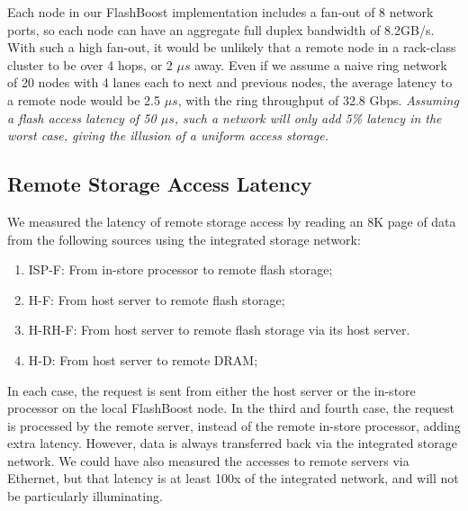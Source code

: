 Each node in our FlashBoost implementation includes a fan-out of 8 network
ports, so each node can have an aggregate full duplex bandwidth of 8.2GB/s. With
such a high fan-out, it would be unlikely that a remote node in a rack-class
cluster to be over 4 hops, or 2 $\mu s$ away. Even if we assume a naive ring
network of 20 nodes with 4 lanes each to next and previous nodes, the average
latency to a remote node would be 2.5 $\mu s$, with the ring throughput of 32.8
Gbps. \emph{Assuming a flash access latency of 50 $\mu s$, such a network will only add 5\% latency in the worst case, giving the illusion of a uniform access storage.}



\subsection{Remote Storage Access Latency}
\label{sec:latency}

We measured the latency of remote storage access by reading an 8K page of data from the following sources using the integrated storage network: 

\begin{enumerate}
\item ISP-F: From in-store processor to remote flash storage;
\item H-F: From host server to remote flash storage;
\item H-RH-F: From host server to remote flash storage via its host server.
\item H-D: From host server to remote DRAM; 
\end{enumerate}

In each case, the request is sent from either the host server or the in-store processor on the local FlashBoost node. In the third and fourth case, the request is processed by the remote server, instead of the remote in-store processor, adding extra latency. However, data is always transferred back via the integrated storage network. We could have also measured the accesses to remote servers via Ethernet, but that latency is at least 100x of the integrated network, and will not be particularly illuminating.

